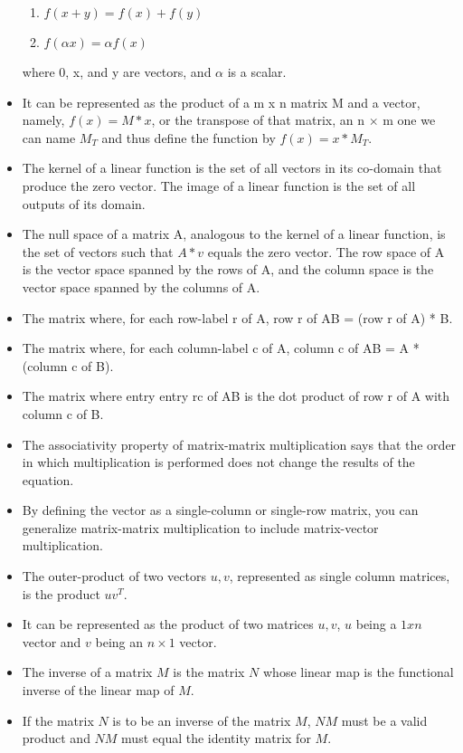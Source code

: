 \documentclass{article}
\begin{document}
\begin{itemize}
\begin{enumerate}
                \item $f(x + y) = f(x) + f(y)$
                \item $f(\alpha x) = \alpha f(x)$
            \end{enumerate}
            where 0, x, and y are vectors, and $\alpha$ is a scalar.
        \item It can be represented as the product of a m x n matrix
            M and a vector, namely, $f(x) = M * x$, or the transpose
            of that matrix, an n $\times$ m one we can name $M_T$ and thus define the
            function by $f(x) = x * M_T$.
        \item The kernel of a linear function is the set of all vectors in
            its co-domain that produce the zero vector. The image of a linear
            function is the set of all outputs of its domain.
        \item The null space of a matrix A, analogous to the kernel of a linear function,
            is the set of vectors such that $A * v$ equals the zero vector. The
            row space of A is the vector space spanned by the rows of A, and
            the column space is the vector space spanned by the columns of A.
        \item The matrix where, for each row-label r of A, row r of AB = (row r of A) * B. 
        \item The matrix where, for each column-label c of A, column c of AB = A * (column c of B).
        \item The matrix where entry entry rc of AB is the dot product of row r of A with column c of B.
        \item The associativity property of matrix-matrix multiplication says
            that the order in which multiplication is performed does not change
            the results of the equation.
        \item By defining the vector as a single-column or single-row matrix,
            you can generalize matrix-matrix multiplication to include
            matrix-vector multiplication.
        \item The outer-product of two vectors $u, v$, represented as single
            column matrices, is the product $uv^T$.
        \item It can be represented as the product of two matrices $u,v$,
            $u$ being a $1 x n$ vector and $v$ being an $n \times 1$ vector.
        \item The inverse of a matrix $M$ is the matrix $N$ whose linear map
            is the functional inverse of the linear map of $M$.
        \item If the matrix $N$ is to be an inverse of the matrix $M$,
            $NM$ must be a valid product and $NM$ must equal the identity
            matrix for $M$.
    \end{itemize}
\end{document}
